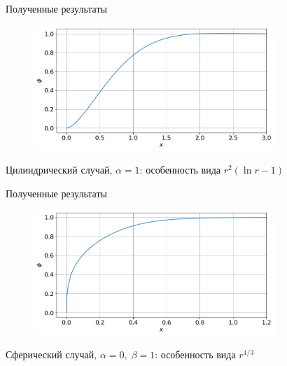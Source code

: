 \begin{frame}{Полученные результаты}
\vspace{-0.6cm}
\begin{figure}
	\includegraphics[width=0.81\textwidth]{../figures/result_volumes_cyl_bi.png}
\end{figure}
\vspace{-0.7cm}
\begin{center}
	Цилиндрический случай, $\alpha = 1$: особенность вида $r^2 (\ln r - 1)$
\end{center}
\end{frame}


\begin{frame}{Полученные результаты}
\vspace{-0.6cm}
\begin{figure}
	\includegraphics[width=0.81\textwidth]{../figures/result_volumes_sph_p.png}
\end{figure}
\vspace{-0.7cm}
\begin{center}
	Сферический случай, $\alpha = 0, \; \beta = 1$: особенность вида $r^{1/3}$
\end{center}
\end{frame}